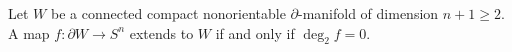 Let $W$ be a connected compact nonorientable $\partial$-manifold of dimension $n+1 \geqslant 2$. A map $f \colon \partial W \to S^{n}$ extends to $W$ if and only if $\deg_2 f = 0$.

